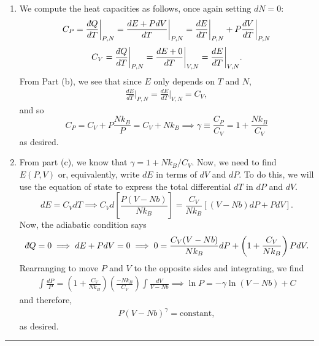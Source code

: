\documentclass{article}
\theoremstyle{definition}
\def\dbar{{\mkern3mu\mathchar'26\mkern-12mu   d}}
\newcommand{\f}[2]{\frac{#1}{#2}}
\newcommand{\lp}{\left(}
\newcommand{\rp}{\right)}
\newcommand{\lb}{\left[}
\newcommand{\rb}{\right]}
\begin{document}
\begin{enumerate}[label=(\alph*)]
	
	\item We compute the heat capacities as follows, once again setting $dN = 0$:
	\begin{equation*}
	C_P = \f{\dbar Q}{d T}\bigg\vert_{P,N} = \f{dE + PdV}{dT}\bigg\vert_{P,N} = \f{dE}{dT}\bigg\vert_{P,N} + P \f{dV}{dT}\bigg\vert_{P,N}
	\end{equation*}
	\begin{align*}
	C_V = \f{\dbar Q}{d T}\bigg\vert_{P,N} = \f{dE + 0}{dT}\bigg\vert_{V,N} = \f{dE}{dT}\bigg\vert_{V,N}.
	\end{align*}
	From Part (b), we see that since $E$ only depends on $T$ and $N$, 
	\begin{align*}
	\f{dE}{dT}\bigg\vert_{P,N} =  \f{dE}{dT}\bigg\vert_{V,N} = C_V,
	\end{align*}
	and so
	\begin{equation*}
	C_P = C_V + P \f{Nk_B}{P} = C_V + Nk_B \implies \boxed{\gamma \equiv \f{C_P}{C_V} = 1 + \f{Nk_B}{C_V}}
	\end{equation*}
	as desired. 
	
	
	\item From part (c), we know that $\gamma = 1 + Nk_B/C_V$. Now, we need to find $E(P,V)$ or, equivalently, write $dE$ in terms of $dV$ and $dP$. To do this, we will use the equation of state to express the total differential $dT$ in $dP$ and $dV$. 
	\begin{equation*}
	dE = C_V dT \implies C_V d\lb \f{P(V-Nb)}{Nk_B}  \rb = \f{C_V}{Nk_B} \lb (V-Nb)dP + PdV  \rb.
	\end{equation*}
	Now, the adiabatic condition says
	\begin{equation*}
	\dbar Q = 0 \implies dE + PdV = 0 \implies 0 = \f{C_V(V-Nb)}{Nk_B} dP + \lp 1+\f{C_V}{Nk_B} \rp PdV.
	\end{equation*}
	Rearranging to move $P$ and $V$ to the opposite sides and integrating, we find 
	\begin{align*}
	\int \f{dP}{P} = \lp 1+\f{C_V}{Nk_B} \rp \lp \f{-Nk_B}{C_V} \rp \int \f{dV}{V-Nb} \implies \ln P = -\gamma \ln (V-Nb) + C
	\end{align*}
	and therefore,
	\begin{align*}
	P(V-Nb)^\gamma = \text{constant},
	\end{align*}
	as desired.
	
\end{enumerate}


\hrule


$\,$\\
\end{document}
